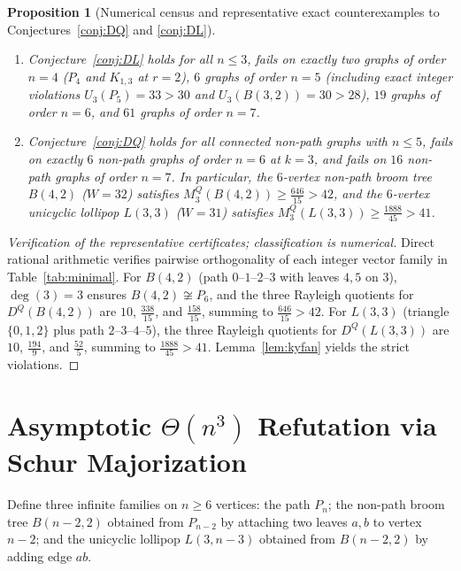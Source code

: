 \documentclass[11pt,a4paper]{article}
\newtheorem{proposition}[theorem]{Proposition}
\theoremstyle{remark}
\begin{document}
\begin{proposition}[Numerical census and representative exact counterexamples to Conjectures~\ref{conj:DQ} and \ref{conj:DL}]\label{thm:minimal}
\leavevmode
\begin{enumerate}
\item Conjecture~\ref{conj:DL} holds for all $n \le 3$, fails on exactly two graphs of order $n=4$ ($P_4$ and $K_{1,3}$ at $r=2$), $6$ graphs of order $n=5$ (including exact integer violations $U_3(P_5) = 33 > 30$ and $U_3(B(3,2)) = 30 > 28$), $19$ graphs of order $n=6$, and $61$ graphs of order $n=7$.
\item Conjecture~\ref{conj:DQ} holds for all connected non-path graphs with $n \le 5$, fails on exactly $6$ non-path graphs of order $n=6$ at $k=3$, and fails on $16$ non-path graphs of order $n=7$. In particular, the $6$-vertex non-path broom tree $B(4,2)$ ($W=32$) satisfies $M_3^Q(B(4,2)) \ge \frac{646}{15} > 42$, and the $6$-vertex unicyclic lollipop $L(3,3)$ ($W=31$) satisfies $M_3^Q(L(3,3)) \ge \frac{1888}{45} > 41$.
\end{enumerate}
\end{proposition}
\begin{proof}[Verification of the representative certificates; classification is numerical]
Direct rational arithmetic verifies pairwise orthogonality of each integer vector family in Table~\ref{tab:minimal}. For $B(4,2)$ (path $0\text{--}1\text{--}2\text{--}3$ with leaves $4,5$ on $3$), $\deg(3)=3$ ensures $B(4,2) \not\cong P_6$, and the three Rayleigh quotients for $D^Q(B(4,2))$ are $10$, $\frac{338}{15}$, and $\frac{158}{15}$, summing to $\frac{646}{15} > 42$. For $L(3,3)$ (triangle $\{0,1,2\}$ plus path $2\text{--}3\text{--}4\text{--}5$), the three Rayleigh quotients for $D^Q(L(3,3))$ are $10$, $\frac{194}{9}$, and $\frac{52}{5}$, summing to $\frac{1888}{45} > 41$. Lemma~\ref{lem:kyfan} yields the strict violations.
\end{proof}

\section{Asymptotic $\Theta(n^3)$ Refutation via Schur Majorization}
Define three infinite families on $n \ge 6$ vertices: the path $P_n$; the non-path broom tree $B(n-2,2)$ obtained from $P_{n-2}$ by attaching two leaves $a,b$ to vertex $n-2$; and the unicyclic lollipop $L(3,n-3)$ obtained from $B(n-2,2)$ by adding edge $ab$.
\end{document}
